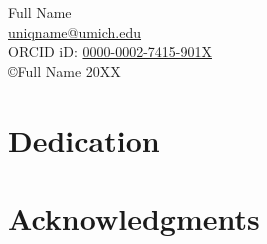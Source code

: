 \vfill

\begin{center}
\begin{onehalfspacing}
  Full Name \\
  \href{mailto:uniqname@umich.edu}{\color{black}uniqname@umich.edu} \\
  ORCID iD: \href{http://orcid.org/0000-0002-7415-901X}{\color{black}0000-0002-7415-901X}\\
  \vspace{0.3in}
  \copyright\;Full Name 20XX
\end{onehalfspacing}
\end{center}

\vfill
\hspace{0pt}

\clearpage


\setcounter{page}{2}

\chapter{Dedication}
\begin{onehalfspace}

\end{onehalfspace}

\chapter{Acknowledgments}
\begin{onehalfspace}

\end{onehalfspace}



\clearpage
{}
\renewcommand*{\contentsname}{Table of Contents}
{\hypersetup{linkcolor=black}\tableofcontents}

